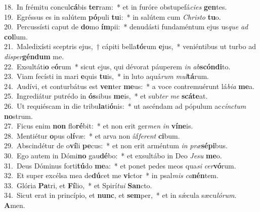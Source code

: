 {18.~}In frémitu concul\textbf{cá}bis \textbf{ter}ram:~* et in furóre obstupefá\textit{ci}\textit{es} \textbf{gen}tes.\\
{19.~}Egréssus es in salútem \textbf{pó}puli \textbf{tu}i:~* in salútem cum \textit{Chri}\textit{sto} \textbf{tu}o.\\
{20.~}Percussísti caput de \textbf{do}mo \textbf{ím}pii:~* denudásti fundaméntum ejus us\textit{que} \textit{ad} \textbf{col}lum.\\
{21.~}Maledixísti sceptris ejus,~† cápiti bella\textbf{tó}rum \textbf{e}jus,~* veniéntibus ut turbo ad \textit{di}\textit{sper}\textbf{gén}\textbf{dum} me.\\
{22.~}Exsultáti\textbf{o} e\textbf{ó}rum~* sicut ejus, qui dévorat páuperem \textit{in} \textit{ab}\textbf{scón}\textbf{di}to.\\
{23.~}Viam fecísti in mari \textbf{e}quis \textbf{tu}is,~* in luto aquá\textit{rum} \textit{mul}\textbf{tá}rum.\\
{24.~}Audívi, et conturbátus est \textbf{ven}ter \textbf{me}us:~* a voce contremuérunt lá\textit{bi}\textit{a} \textbf{me}a.\\
{25.~}Ingrediátur putrédo in \textbf{ós}sibus \textbf{me}is,~* et sub\textit{ter} \textit{me} \textbf{scá}\textbf{te}at.\\
{26.~}Ut requiéscam in die tribu\textbf{la}ti\textbf{ó}nis:~* ut ascéndam ad pópulum ac\textit{cín}\textit{ctum} \textbf{no}strum.\\
{27.~}Ficus enim \textbf{non} flo\textbf{ré}bit:~* et non erit ger\textit{men} \textit{in} \textbf{ví}\textbf{ne}is.\\
{28.~}Mentiétur \textbf{o}pus o\textbf{lí}væ:~* et arva non áf\textit{fe}\textit{rent} \textbf{ci}bum.\\
{29.~}Abscindétur de o\textbf{ví}li \textbf{pe}cus:~* et non erit arméntum \textit{in} \textit{præ}\textbf{sé}\textbf{pi}bus.\\
{30.~}Ego autem in Dómi\textbf{no} gau\textbf{dé}bo:~* et exsultábo in Deo \textit{Je}\textit{su} \textbf{me}o.\\
{31.~}Deus Dóminus forti\textbf{tú}do \textbf{me}a:~* et ponet pedes meos qua\textit{si} \textit{cer}\textbf{vó}rum.\\
{32.~}Et super excélsa mea de\textbf{dú}cet me \textbf{vi}ctor~* in psal\textit{mis} \textit{ca}\textbf{nén}tem.\\
{33.~}Glória \textbf{Pa}tri, et \textbf{Fí}lio,~* et Spirí\textit{tu}\textit{i} \textbf{San}cto.\\
{34.~}Sicut erat in princípio, et \textbf{nunc}, et \textbf{sem}per,~* et in sǽcula sæcu\textit{ló}\textit{rum}. \textbf{A}men.\\
